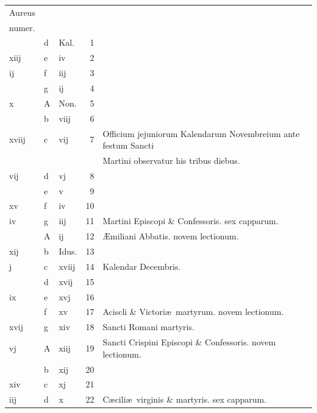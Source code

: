 \documentclass[letter,11pt]{book}
\begin{document}
\begin{center}
\begin{tabular}{l | l | l | r | l}
\color{Red}Aureus & & & \\
\color{Red}numer. & & & \\
\color{Red}  & d & \color{Red} Kal. & 1 & \\
\color{Red} xiij & e & \color{Red} iv & 2 & \\
\color{Red} ij & f & \color{Red} iij & 3 & \\
\color{Red}  & g & \color{Red} ij & 4 & \\
\color{Red} x & \color{Red} A & Non. & 5 & \\
\color{Red}  & b & \color{Red} viij & 6 & \\
\color{Red} xviij & c & \color{Red} vij & 7 & Officium jejuniorum Kalendarum Novembreium ante festum Sancti \\
\color{Red}  &  &  &  & \quad Martini observatur his tribus diebus. \\
\color{Red} vij & d & \color{Red} vj & 8 & \\
\color{Red}  & e & \color{Red} v & 9 & \\
\color{Red} xv & f & \color{Red} iv & 10 & \\
\color{Red} iv & g & \color{Red} iij & 11 & Martini Episcopi \& Confessoris. \color{Red} sex capparum. \\
\color{Red}  & \color{Red} A & \color{Red} ij & 12 & \AE miliani Abbatis. \color{Red} novem lectionum. \\
\color{Red} xij & b & Idus. & 13 & \\
\color{Red} j & c & \color{Red} xviij & 14 & \qquad Kalendar Decembris. \\
\color{Red}  & d & \color{Red} xvij & 15 & \\
\color{Red} ix & e & \color{Red} xvj & 16 & \\
\color{Red}  & f & \color{Red} xv & 17 & Aciscli \& Victori\ae \ martyrum. \color{Red} novem lectionum. \\
\color{Red} xvij & g & \color{Red} xiv & 18 & Sancti Romani martyris. \\
\color{Red} vj & \color{Red} A & \color{Red} xiij & 19 & Sancti Crispini Episcopi \& Confessoris. \color{Red} novem lectionum. \\
\color{Red}  & b & \color{Red} xij & 20 & \\
\color{Red} xiv & c & \color{Red} xj & 21 & \\
\color{Red} iij & d & \color{Red} x & 22 & C\ae cili\ae \ virginis \& martyris. \color{Red} sex capparum. \\

\end{tabular}
\end{center}
\end{document}
